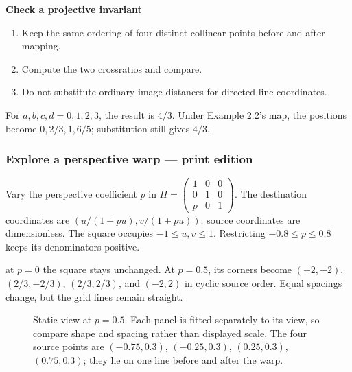 \documentclass[letterpaper,11pt,english,openany,oneside]{jupyterBook}
\begin{document}
\begin{TextbookBox}
\textbf{Check a projective invariant}\par\smallskip
\begin{enumerate}
%
\item {}
\sphinxAtStartPar
Keep the same ordering of four distinct collinear points before and after mapping.

\item {}
\sphinxAtStartPar
Compute the two cross\sphinxhyphen{}ratios and compare.

\item {}
\sphinxAtStartPar
Do not substitute ordinary image distances for directed line coordinates.

\end{enumerate}

\sphinxAtStartPar
For \(a,b,c,d=0,1,2,3\), the result is \(4/3\). Under Example 2.2’s map, the positions become \(0,2/3,1,6/5\); substitution still gives \(4/3\).

\end{TextbookBox}
\label{\detokenize{lectures/lecture02/homographies:lec02-interactive}}
\subsubsection*{Explore a perspective warp — print edition}

\sphinxAtStartPar
Vary the perspective coefficient \(p\) in \(H=\begin{pmatrix}1&0&0\\0&1&0\\p&0&1\end{pmatrix}\). The destination coordinates are \((u/(1+pu),v/(1+pu))\); source coordinates are dimensionless. The square occupies \(-1\le u,v\le1\). Restricting \(-0.8\le p\le0.8\) keeps its denominators positive.

\sphinxAtStartPar
{} at \(p=0\) the square stays unchanged. At \(p=0.5\), its corners become \((-2,-2)\), \((2/3,-2/3)\), \((2/3,2/3)\), and \((-2,2)\) in cyclic source order. Equal spacings change, but the grid lines remain straight.

\begin{figure}[H]
\centering
\capstart

\noindent{}
\caption{Static view at \(p=0.5\). Each panel is fitted separately to its view, so compare shape and spacing rather than displayed scale. The four source points are \((-0.75,0.3)\), \((-0.25,0.3)\), \((0.25,0.3)\), \((0.75,0.3)\); they lie on one line before and after the warp.}\label{\detokenize{lectures/lecture02/homographies:fig-lec02-interactive}}\end{figure}
\end{document}
